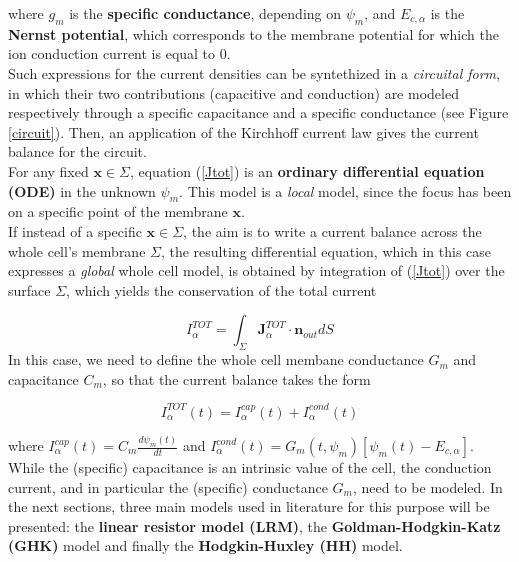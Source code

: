 \documentclass[12pt, a4paper]{report}
\begin{document}
where $g_m$ is the \textbf{specific conductance}, depending on $\psi_m$, and $E_{c,\alpha}$ is the \textbf{Nernst potential}, which corresponds to the  membrane potential for which the ion conduction current is equal to $0$.\\
Such expressions for the current densities can be syntethized in a \textit{circuital form}, in which their two contributions (capacitive and conduction) are modeled respectively through a specific capacitance and a specific conductance (see Figure \ref{circuit}). Then, an application of the Kirchhoff current law  gives the current balance for the circuit.\\
For any fixed $\textbf{x} \in \Sigma$,  equation (\ref{Jtot}) is an \textbf{ordinary differential equation (ODE)} in the unknown $\psi_m$. This model is a \textit{local} model, since the focus has been on a specific point of the membrane $\textbf{x}$.
\\
If instead of a specific $\textbf{x} \in \Sigma$, the aim is to write a current balance across the whole cell's membrane $\Sigma$, the resulting differential equation, which in this case expresses a \textit{global} whole cell model, is obtained by integration of (\ref{Jtot})  over the surface $\Sigma$,  which yields the conservation of the total current 

\begin{equation}
I_{\alpha}^{TOT} = \int_{\Sigma} \textbf{J}_{\alpha}^{TOT} \cdot \textbf{n}_{out} dS 
\end{equation} 
In this case, we need to define the whole cell membane conductance $ G_m$ and capacitance $ C_m $, so that the current balance takes the form

\begin{equation}
I_{\alpha}^{TOT}(t) = I_{\alpha}^{cap}(t) + I_{\alpha}^{cond}(t)
\end{equation}

where $  I_{\alpha}^{cap}(t) = C_m \frac{d \psi_m(t)}{d t}$ and $ I_{\alpha}^{cond}(t) = G_m(t,\psi_m) [\psi_m(t) - E_{c,\alpha}]$.\\
While the (specific) capacitance is an intrinsic value of the cell, the conduction current, and  in particular the (specific) conductance $G_m$, need to be modeled. In the next sections, three main models used in literature for this purpose will be presented: the \textbf{linear resistor model (LRM)}, the \textbf{Goldman-Hodgkin-Katz (GHK)} model and finally the \textbf{Hodgkin-Huxley (HH)} model.\\
\end{document}
